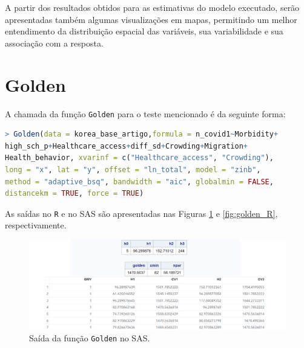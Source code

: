 \documentclass[12pt, a4paper, twoside]{report}
\numberwithin{equation}{section} %
\begin{document}
A partir dos resultados obtidos para as estimativas do modelo executado, serão apresentadas também algumas visualizações em mapas, permitindo um melhor entendimento da distribuição espacial das variáveis, sua variabilidade e sua associação com a resposta.


\section{Golden}\label{secao_6_2}

A chamada da função \texttt{Golden} para o teste mencionado é da seguinte forma:

\begin{lstlisting}[language=R]
> Golden(data = korea_base_artigo,formula = n_covid1~Morbidity+
high_sch_p+Healthcare_access+diff_sd+Crowding+Migration+
Health_behavior, xvarinf = c("Healthcare_access", "Crowding"),
long = "x", lat = "y", offset = "ln_total", model = "zinb",
method = "adaptive_bsq", bandwidth = "aic", globalmin = FALSE,
distancekm = TRUE, force = TRUE)
\end{lstlisting}

As saídas no \texttt{R} e no SAS são apresentadas nas Figuras \ref{fig:golden_sas} e \ref{fig:golden_R}, respectivamente.

\begin{figure}[H]
    \centering
    \includegraphics[width=1.0\textwidth]{golden_sas.png}
    \caption{Saída da função \texttt{Golden} no SAS.}
\label{fig:golden_sas}
\end{figure}
\end{document}
